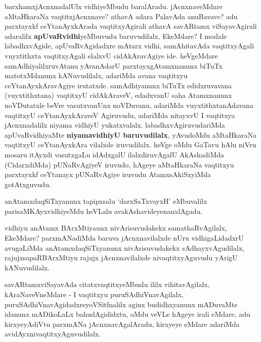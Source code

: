 \centerline{}

\begin{artha}
barxhamxjAcnxnadalUlx vidhiyeMbudu baralAradu. jAcnxnaveMdare aMtaHkaraNa
vaqtitxjAcnxnave? athavA adara PalavAda anuBavave? adu
parxtayxkf ceYtanAyxkArada vaqtitxyAgirali athavA savARtamx
viSayavAgirali adaralilx \textbf{apUvaRvidhi}yeMbu\-vudu baruvudilalx,
EkeMdare? I modale labadhxvAgide, apUvaRvAgidadxre mAtarx vidhi,
samAhitavAda vaqtitxyAgali vuyxtithxta vaqtitxyAgali elalxvU
cidAkAravAgiye ide. heVgeMdare samAdhiyalilxruvAtanu yAvanAdarU
parxtayxgAtamxnanunx biTuTx matotxMdanunx kANuvudilalx, adariMda avana
vaqtitxyu ceYtanAyxkAravAgiye irutatxde. samAdhiyanunx biTuTx
edidxruvavana (vuyxtithxtana) vaqtitxyU cidAkAraveV, edadxvanU saha
Atamxnanunx noVDutatxle beVre vasutxvanUnx noVDuvanu, adariMda
vuyxtithxtanAdavana vaqtitxyU ceYtanAyxkAraveV Agiruvudu, adariMda
nitayxvU I vaqtitxya jAcnxnadalilx niyama vidhiyU yukatxvalalx.
labadhxvAgiruvudariMda apUvaRvidhiyaMte
\textbf{niyamavidhiyU baruvudilalx}, yAvudoMdu aMtaHkaraNa vaqtitxyU
ceYtanAyxkAra vilalxde iruvudilalx. heVge oMdu GaTavu hAlu niVru mosaru
itAyxdi vasutxgaLu idAdxgalU ilalxdiruvAgalU AkAshadiMda (CidarxdiMda)
pUNaRvAgiyeV iruvudo, hAgeye aMtaHkaraNa vaqtitxyu parxtayxkf
ceYtanayx pUNaRvAgiye iruvudu AtamxsAkiSxyiMda gotAtxguvudu.
\end{artha}

\centerline{}

\begin{artha}
anAtamxdaqSiTxyanunx tapipxsalu `darxSaTxvayxH' eMbuvalilx
parisaMKAyxvidhiyeMdu heVLalu avakAshavideyenanxlAgadu.

vidhiyu anAtamx BArxMtiyaunx nivArisuvudakekx samathaRvAgilalx,
EkeMdare? parxmANadiMda baruva jAcnxnavilalxde nUru vidhigaLidadxrU
avugaLiMda anAtamxdaqSiTxyanunx nivArisuvudakekx sAdhayxvAgudilalx,
rajujxsapaRBArxMtiyu rajujx jAcnxnavilalxde nivaqtitxyAguvudu yArigU kANuvudilalx.
\end{artha}

\begin{artha}
savARtamxviSayavAda citatxvaqtitxyeMbudu ililx vihitavAgilalx,
kAraNa\-\break veVneMdare - I vaqtitxyu puruSAdhiVnavAgilalx,
puruSAdhiVnavAgidadxre\break yoVSitfnalilx aginx budidhxyanunx mADuvaMte
idanunx mADikoLaLx bahudAgididxtu, oMdu veVLe hAgeye irali eMdare,
adu kirxyeyAdiVtu parxmANa jAcnxnavAgalAradu, kirxyeye eMdare adariMda avidAyxnivaqtitxyAguvudilalx.
\end{artha}

